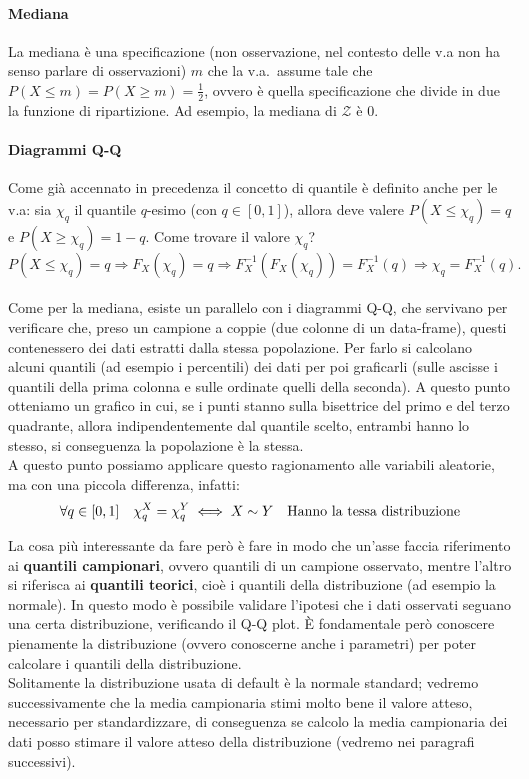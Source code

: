 \paragraph{Mediana}
La mediana è una specificazione (non osservazione, nel contesto delle v.a non ha senso parlare di osservazioni) $m$ che la v.a.\ assume tale che $P(X \leq m) = P(X \geq m) = \frac{1}{2}$, ovvero è quella specificazione che divide in due la funzione di ripartizione. Ad esempio, la mediana di $\mathcal{Z}$ è $0$.

\paragraph{Diagrammi Q-Q}
Come già accennato in precedenza il concetto di quantile è definito anche per le v.a: sia $\chi_q$ il quantile $q$-esimo (con $q \in [0,1]$), allora deve valere $P(X \leq \chi_q) = q$ e $P(X \geq \chi_q) = 1 - q$.
Come trovare il valore $\chi_q$?
$$
P(X \leq \chi_q) = q \Longrightarrow F_X(\chi_q) = q \Longrightarrow F^{-1}_X(F_X(\chi_q)) = F_X^{-1}(q) \Longrightarrow \chi_q = F^{-1}_X(q).
$$ \\

Come per la mediana, esiste un parallelo con i diagrammi Q-Q, che servivano per verificare che, preso un campione a coppie (due colonne di un data-frame), questi contenessero dei dati estratti dalla stessa popolazione. Per farlo si calcolano alcuni quantili (ad esempio i percentili) dei dati per poi graficarli (sulle ascisse i quantili della prima colonna e sulle ordinate quelli della seconda).
A questo punto otteniamo un grafico in cui, se i punti stanno sulla bisettrice del primo e del terzo quadrante, allora indipendentemente dal quantile scelto, entrambi hanno lo stesso, si conseguenza la popolazione è la stessa. \\
A questo punto possiamo applicare questo ragionamento alle variabili aleatorie, ma con una piccola differenza, infatti:
$$
    \forall q \in [0, 1] \quad \chi_q^{X} = \chi_q^{Y} \iff X \sim Y \quad \textnormal{Hanno la tessa distribuzione}
$$

La cosa più interessante da fare però è fare in modo che un'asse faccia riferimento ai \textbf{quantili campionari}, ovvero quantili di un campione osservato, mentre l'altro si riferisca ai \textbf{quantili teorici}, cioè i quantili della distribuzione (ad esempio la normale).
In questo modo è possibile validare l'ipotesi che i dati osservati seguano una certa distribuzione, verificando il Q-Q plot.
È fondamentale però conoscere pienamente la distribuzione (ovvero conoscerne anche i parametri) per poter calcolare i quantili della distribuzione. \\
Solitamente la distribuzione usata di default è la normale standard; vedremo successivamente che la media campionaria stimi molto bene il valore atteso, necessario per standardizzare, di conseguenza se calcolo la media campionaria dei dati posso stimare il valore atteso della distribuzione (vedremo nei paragrafi successivi). 
\newpage
